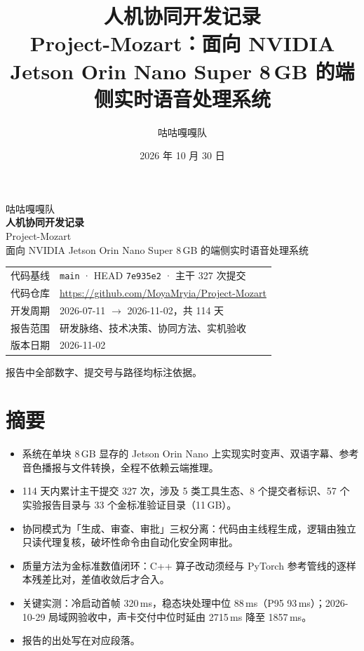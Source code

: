 \documentclass[11pt,a4paper]{ctexart}
\title{\bfseries 人机协同开发记录\\[0.4em]
  \large Project-Mozart：面向 NVIDIA Jetson Orin Nano Super 8\,GB 的端侧实时语音处理系统}
\author{咕咕嘎嘎队}
\date{2026 年 10 月 30 日}
\newcommand{\code}[1]{\texttt{#1}}
\begin{document}
\begin{titlepage}
\centering
\vspace*{3.2cm}
{\sffamily\large 咕咕嘎嘎队}\\[2.2cm]
{\bfseries\Huge 人机协同开发记录}\\[0.9cm]
{\large Project-Mozart}\\[0.35cm]
{\large 面向 NVIDIA Jetson Orin Nano Super 8\,GB 的端侧实时语音处理系统}\\[2.4cm]
\begin{tabular}{@{}rl@{}}
代码基线 & \code{main} · HEAD \code{7e935e2} · 主干 327 次提交 \\
代码仓库 & \url{https://github.com/MoyaMryia/Project-Mozart} \\
开发周期 & 2026-07-11 $\rightarrow$ 2026-11-02，共 114 天 \\
报告范围 & 研发脉络、技术决策、协同方法、实机验收 \\
版本日期 & 2026-11-02\\
\end{tabular}
\vfill
{\small 报告中全部数字、提交号与路径均标注依据。}
\end{titlepage}

\tableofcontents
\newpage

\section*{摘要}

\begin{itemize}[leftmargin=1.6em,itemsep=0.25em]
  \item 系统在单块 8\,GB 显存的 Jetson Orin Nano 上实现实时变声、双语字幕、参考音色播报与文件转换，全程不依赖云端推理。
  \item 114 天内累计主干提交 327 次，涉及 5 类工具生态、8 个提交者标识、57 个实验报告目录与 33 个金标准验证目录（11\,GB）。
  \item 协同模式为「生成、审查、审批」三权分离：代码由主线程生成，逻辑由独立只读代理复核，破坏性命令由自动化安全网审批。
  \item 质量方法为金标准数值闭环：C++ 算子改动须经与 PyTorch 参考管线的逐样本残差比对，差值收敛后才合入。
  \item 关键实测：冷启动首帧 320\,ms，稳态块处理中位 88\,ms（P95 93\,ms）；2026-10-29 局域网验收中，声卡交付中位时延由 2715\,ms 降至 1857\,ms。
  \item 报告的出处写在对应段落。
\end{itemize}
\end{document}
